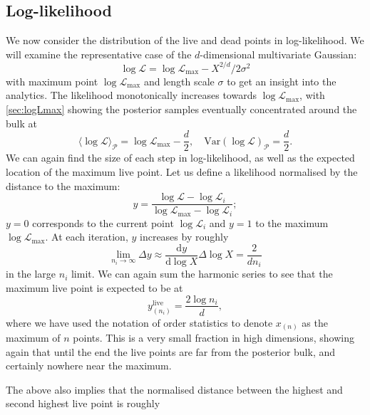 \documentclass[usenatbib]{mnras}
\newcommand{\nlive}{n_i}
\newcommand{\Like}{\mathcal{L}}
\newcommand{\logLmax}{\log \Like_\mathrm{max}}
\begin{document}
\subsection{Log-likelihood}\label{sec:logL}
We now consider the distribution of the live and dead points in log-likelihood. We will examine the representative case of the $d$-dimensional multivariate Gaussian:
\begin{equation}\label{eq:gaussian_logL}
    \log \Like = \logLmax - X^{2/d}/2\sigma^2
\end{equation}
with maximum point $\logLmax$ and length scale $\sigma$ to get an insight into the analytics. The likelihood monotonically increases towards $\logLmax$, with \cref{sec:logLmax} showing the posterior samples eventually concentrated around the bulk at
\begin{equation}
    \langle\log\Like\rangle_\mathcal{P} = \log\mathcal{L}_\mathrm{max} - \frac{d}{2},  \quad \mathrm{Var}(\log\mathcal{L})_\mathcal{P} = \frac{d}{2}.
\end{equation}
We can again find the size of each step in log-likelihood, as well as the expected location of the maximum live point. Let us define a likelihood normalised by the distance to the maximum:
\begin{equation}
    y = \frac{\log\mathcal{L}-\log\mathcal{L}_i}{\log\mathcal{L}_\mathrm{max}-\log\mathcal{L}_i};
    \label{eq:normalised_likelihood}
\end{equation}
$y=0$ corresponds to the current point $\log\mathcal{L}_i$ and $y=1$ to the maximum $\log\mathcal{L}_\mathrm{max}$. At each iteration, $y$ increases by roughly
\begin{equation}
    \lim_{\nlive \to \infty}\Delta y \approx \frac{\mathrm{d} y}{\mathrm{d}\log X} \Delta \log X = \frac{2}{d \nlive}  
\end{equation}
in the large $\nlive$ limit. We can again sum the harmonic series to see that the maximum live point is expected to be at 
\begin{equation}
    y_{(\nlive)}^{\mathrm{live}} = \frac{2\log \nlive}{d},
\end{equation}
where we have used the notation of order statistics to denote $x_{(n)}$ as the maximum of $n$ points. This is a very small fraction in high dimensions, showing again that until the end the live points are far from the posterior bulk, and certainly nowhere near the maximum.
\par
The above also implies that the normalised distance between the highest and second highest live point is roughly 
\end{document}
